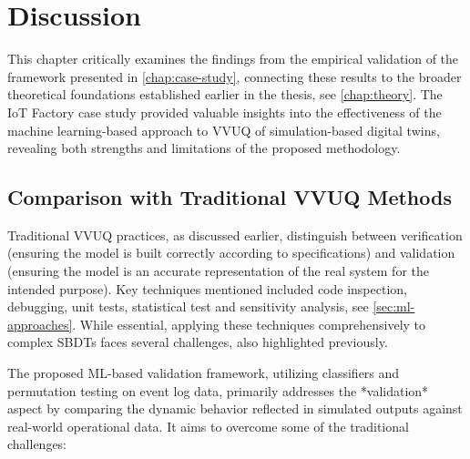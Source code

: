\chapter{Discussion}
\label{chap:discussion}

This chapter critically examines the findings from the empirical validation of the framework presented in \autoref{chap:case-study}, connecting these results to the broader theoretical foundations established earlier in the thesis, see \autoref{chap:theory}. The IoT Factory case study provided valuable insights into the effectiveness of the machine learning-based approach to VVUQ of simulation-based digital twins, revealing both strengths and limitations of the proposed methodology.

\section{Comparison with Traditional VVUQ Methods}
\label{sec:comparison_manual}

Traditional VVUQ practices, as discussed earlier, distinguish between verification (ensuring the model is built correctly according to specifications) and validation (ensuring the model is an accurate representation of the real system for the intended purpose). Key techniques mentioned included code inspection, debugging, unit tests, statistical test and sensitivity analysis, see \autoref{sec:ml-approaches}. While essential, applying these techniques comprehensively to complex SBDTs faces several challenges, also highlighted previously.

The proposed ML-based validation framework, utilizing classifiers and permutation testing on event log data, primarily addresses the *validation* aspect by comparing the dynamic behavior reflected in simulated outputs against real-world operational data. It aims to overcome some of the traditional challenges:

